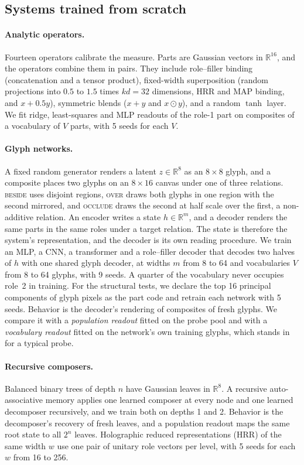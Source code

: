 \documentclass[10pt]{article}
\theoremstyle{plain}
\theoremstyle{remark}
\newcommand{\R}{\mathbb{R}}
\begin{document}
\subsection{Systems trained from scratch}
\label{sec:design_scratch}

\paragraph{Analytic operators.} Fourteen operators calibrate the measure. Parts are Gaussian vectors in $\R^{16}$, and the operators combine them in pairs. They include role--filler binding (concatenation and a tensor product), fixed-width superposition (random projections into $0.5$ to $1.5$ times $kd = 32$ dimensions, HRR and MAP binding, and $x + 0.5y$), symmetric blends ($x + y$ and $x \odot y$), and a random $\tanh$ layer. We fit ridge, least-squares and MLP readouts of the role-1 part on composites of a vocabulary of $V$ parts, with 5 seeds for each $V$.

\paragraph{Glyph networks.} A fixed random generator renders a latent $z \in \R^{8}$ as an $8 \times 8$ glyph, and a composite places two glyphs on an $8 \times 16$ canvas under one of three relations. \textsc{beside} uses disjoint regions, \textsc{over} draws both glyphs in one region with the second mirrored, and \textsc{occlude} draws the second at half scale over the first, a non-additive relation. An encoder writes a state $h \in \R^m$, and a decoder renders the same parts in the same roles under a target relation. The state is therefore the system's representation, and the decoder is its own reading procedure. We train an MLP, a CNN, a transformer and a role--filler decoder that decodes two halves of $h$ with one shared glyph decoder, at widths $m$ from 8 to 64 and vocabularies $V$ from 8 to 64 glyphs, with 9 seeds. A quarter of the vocabulary never occupies role~2 in training. For the structural tests, we declare the top 16 principal components of glyph pixels as the part code and retrain each network with 5 seeds. Behavior is the decoder's rendering of composites of fresh glyphs. We compare it with a \emph{population readout} fitted on the probe pool and with a \emph{vocabulary readout} fitted on the network's own training glyphs, which stands in for a typical probe.

\paragraph{Recursive composers.} Balanced binary trees of depth $n$ have Gaussian leaves in $\R^8$. A recursive auto-associative memory \citep{pollack1990} applies one learned composer at every node and one learned decomposer recursively, and we train both on depths 1 and 2. Behavior is the decomposer's recovery of fresh leaves, and a population readout maps the same root state to all $2^n$ leaves. Holographic reduced representations (HRR) of the same width $w$ use one pair of unitary role vectors per level, with 5 seeds for each $w$ from 16 to 256.
\end{document}
